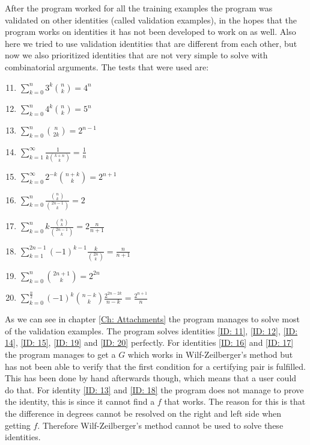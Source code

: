 After the program worked for all the training examples the program was validated on other identities (called validation examples), in the hopes that the program works on identities it has not been developed to work on as well. Also here we tried to use validation identities that are different from each other, but now we also prioritized identities that are not very simple to solve with combinatorial arguments. The tests that were used are:
\begin{enumerate}
  \setcounter{enumi}{10}
  \item $\sum_{k=0}^n 3^k\binom{n}{k} = 4^n$ \label{ID: 11}
  \item $\sum_{k=0}^n 4^k\binom{n}{k} = 5^n$ \label{ID: 12}
  \item $\sum_{k=0}^n \binom{n}{2k} = 2^{n-1}$ \label{ID: 13}
  \item $\sum_{k=1}^\infty \frac{1}{k\binom{k+n}{k}} = \frac{1}{n}$ \label{ID: 14}
  \item $\sum_{k=0}^\infty 2^{-k}\binom{n+k}{k} = 2^{n+1}$ \label{ID: 15}
  \item $\sum_{k=0}^n \frac{\binom{n}{k}}{\binom{2n-1}{k}} = 2$ \label{ID: 16}
  \item $\sum_{k=0}^n k\frac{\binom{n}{k}}{\binom{2n-1}{k}} = 2\frac{n}{n+1}$ \label{ID: 17}
  \item $\sum_{k=1}^{2n-1} (-1)^{k-1}\frac{k}{\binom{2n}{k}} = \frac{n}{n+1}$ \label{ID: 18}
  \item $\sum_{k=0}^n \binom{2n+1}{k} = 2^{2n}$ \label{ID: 19}
  \item $\sum_{k=0}^{\frac{n}{2}} (-1)^k\binom{n-k}{k}\frac{2^{2n-2k}}{n-k} = \frac{2^{n+1}}{n}$ \label{ID: 20}
\end{enumerate}
As we can see in chapter \ref{Ch: Attachments} the program manages to solve most of the validation examples. The program solves identities \ref{ID: 11}, \ref{ID: 12}, \ref{ID: 14}, \ref{ID: 15}, \ref{ID: 19} and \ref{ID: 20} perfectly. For identities \ref{ID: 16} and \ref{ID: 17} the program manages to get a $G$ which works in Wilf-Zeilberger's method but has not been able to verify that the first condition for a certifying pair is fulfilled. This has been done by hand afterwards though, which means that a user could do that. For identity \ref{ID: 13} and \ref{ID: 18} the program does not manage to prove the identity, this is since it cannot find a $f$ that works. The reason for this is that the difference in degrees cannot be resolved on the right and left side when getting $f$. Therefore Wilf-Zeilberger's method cannot be used to solve these identities.
